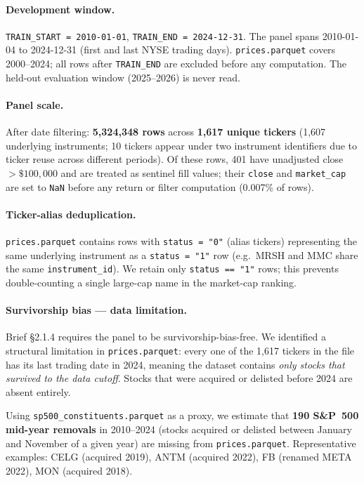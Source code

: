 \documentclass[12pt,a4paper]{article}
\begin{document}
\paragraph{Development window.}
\texttt{TRAIN\_START = 2010-01-01}, \texttt{TRAIN\_END = 2024-12-31}.
The panel spans 2010-01-04 to 2024-12-31 (first and last NYSE trading days).
\texttt{prices.parquet} covers 2000--2024; all rows after \texttt{TRAIN\_END} are
excluded before any computation.  The held-out evaluation window (2025--2026)
is never read.

\paragraph{Panel scale.}
After date filtering: \textbf{5,324,348 rows} across \textbf{1,617 unique tickers}
(1,607 underlying instruments; 10 tickers appear under two instrument identifiers
due to ticker reuse across different periods).
Of these rows, 401 have unadjusted close $> \$100{,}000$ and are treated as
sentinel fill values; their \texttt{close} and \texttt{market\_cap} are set to
\texttt{NaN} before any return or filter computation (0.007\% of rows).

\paragraph{Ticker-alias deduplication.}
\texttt{prices.parquet} contains rows with \texttt{status = "0"} (alias tickers)
representing the same underlying instrument as a \texttt{status = "1"} row
(e.g.\ MRSH and MMC share the same \texttt{instrument\_id}).
We retain only \texttt{status == "1"} rows; this prevents double-counting a
single large-cap name in the market-cap ranking.

\paragraph{Survivorship bias --- data limitation.}
Brief §2.1.4 requires the panel to be survivorship-bias-free.
We identified a structural limitation in \texttt{prices.parquet}: every one of
the 1,617 tickers in the file has its last trading date in 2024, meaning the
dataset contains \emph{only stocks that survived to the data cutoff}.
Stocks that were acquired or delisted before 2024 are absent entirely.

Using \texttt{sp500\_constituents.parquet} as a proxy, we estimate that
\textbf{190 S\&P~500 mid-year removals} in 2010--2024 (stocks acquired or
delisted between January and November of a given year) are missing from
\texttt{prices.parquet}.  Representative examples: CELG (acquired 2019),
ANTM (acquired 2022), FB (renamed META 2022), MON (acquired 2018).
\end{document}
